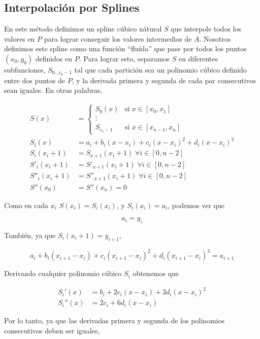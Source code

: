 \subsection{Interpolaci\'on por Splines}

En este m\'etodo definimos un spline c\'ubico n\'atural $S$ que interpole todos
los valores en $P$ para lograr conseguir los valores intermedios de $A$.
Nosotros definimos este spline como una funci\'on ``flu\'ida'' que pase por
todos los puntos $(x_0, y_0)$ definidos en $P$. Para lograr esto, separamos $S$
en diferentes subfunciones, $S_{0 \ldots c_0 - 1}$ tal que cada partici\'on sea
un polinomio c\'ubico definido entre dos puntos de $P$, y la derivada primera y
segunda de cada par consecutivos sean iguales. En otras palabras,

\[
\begin{split}
S(x) & =
\begin{cases}
	S_0(x) & \text{si } x \in [x_0, x_1] \\
	\vdots \\
	S_{c_1 - 1} & \text{si } x \in [x_{n - 1}, x_n]
\end{cases} \\
S_i(x) & = a_i + b_i(x - x_i) + c_i(x - x_i)^2 + d_i(x - x_i)^3 \\
S_i(x_i + 1) & = S_{x + 1}(x_i + 1) \; \forall i \in [0, n - 2] \\
S'_i(x_i + 1) & = S'_{x + 1}(x_i + 1) \; \forall i \in [0, n - 2] \\
S''_i(x_i + 1) & = S''_{x + 1}(x_i + 1) \; \forall i \in [0, n - 2] \\
S''(x_0) & = S''(x_n) = 0
\end{split}
\]

Como en cada $x_i$ $S(x_i) = S_i(x_i)$, y $S_i(x_i) = a_i$, podemos ver que

\[
a_i = y_i
\]

Tambi\'en, ya que $S_i(x_i + 1) = y_{i + 1}$,

\[
a_i + b_i(x_{i + 1} - x_i) + c_i(x_{i + 1} - x_i)^2 + d_i(x_{i + 1} - x_i)^3 = a_{i + 1}
\]

Derivando cualquier polinomio c\'ubico $S_i$ obtenemos que

\[
\begin{split}
S_i'(x) & = b_i + 2 c_i (x - x_i) + 3 d_i (x - x_i)^2 \\
S_i''(x) & = 2 c_i + 6 d_i (x - x_i)
\end{split}
\]

Por lo tanto, ya que las derivadas primera y segunda de los polinomios
consecutivos deben ser iguales,

